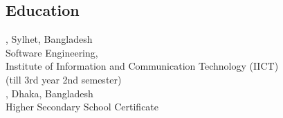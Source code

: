 \documentclass[mm]{simple_style}
\begin{document}
\begin{resume}
\vspace{-3mm}
\section{Education}
, Sylhet, Bangladesh\\
Software Engineering,\\ Institute of Information and Communication Technology (IICT)  \\
\vspace{2mm}
 (till 3rd year 2nd semester)\\
, Dhaka, Bangladesh \\
Higher Secondary School Certificate
 \hspace\\
\vspace{-3ex}
\sectionline
\vspace{-3mm}

\end{resume}
\end{document}
